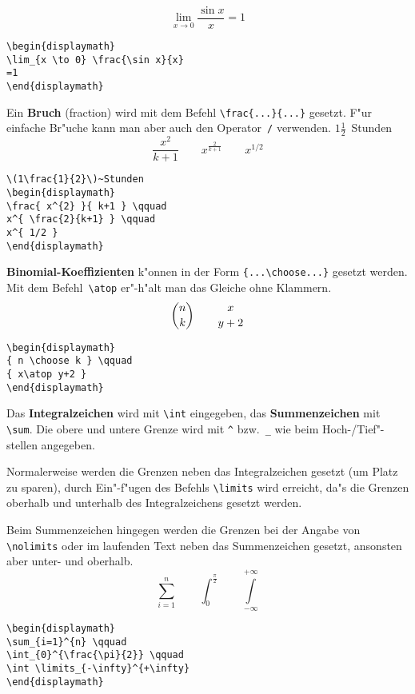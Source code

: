 \exa
\begin{displaymath}
\lim_{x \to 0} \frac{\sin x}{x}
=1
\end{displaymath}
\exb
\begin{verbatim}
\begin{displaymath}
\lim_{x \to 0} \frac{\sin x}{x}
=1
\end{displaymath}
\end{verbatim}
\exc
 
Ein \textbf{Bruch} (fraction) wird mit dem Befehl
\verb|\frac{...}{...}| gesetzt.  F"ur einfache Br"uche kann man
aber auch den Operator~\verb|/| verwenden.
\exa
\(1\frac{1}{2}\)~Stunden
\begin{displaymath}
\frac{ x^{2} }{ k+1 } \qquad
x^{ \frac{2}{k+1} } \qquad
x^{ 1/2 }
\end{displaymath}
\exb
\begin{verbatim}
\(1\frac{1}{2}\)~Stunden
\begin{displaymath}
\frac{ x^{2} }{ k+1 } \qquad
x^{ \frac{2}{k+1} } \qquad
x^{ 1/2 }
\end{displaymath}
\end{verbatim}
\exc

\textbf{Binomial-Koeffizienten} k"onnen in der Form
\verb|{...\choose...}| gesetzt werden.
Mit dem Befehl~\verb|\atop| er"-h"alt man das Gleiche ohne
Klammern.
\exa
\begin{displaymath}
{ n \choose k } \qquad
{ x\atop y+2 }
\end{displaymath}
\exb
\begin{verbatim}
\begin{displaymath}
{ n \choose k } \qquad
{ x\atop y+2 }
\end{displaymath}
\end{verbatim}
\exc

\medskip

Das \textbf{Integralzeichen} wird mit \verb|\int| eingegeben, das
\textbf{Summenzeichen} mit \verb|\sum|.
Die obere und untere Grenze wird mit \verb|^| bzw.~\verb|_| wie
beim \mbox{Hoch-}\slash Tief"-stellen angegeben.
 
Normalerweise werden die Grenzen neben das Integralzeichen
gesetzt (um Platz zu sparen), durch Ein"-f"ugen des Befehls
\verb|\limits| wird erreicht, da"s die Grenzen oberhalb und
unterhalb des Integralzeichens gesetzt werden.
 
Beim Summenzeichen hingegen werden die Grenzen bei der Angabe von
\verb|\nolimits| oder im laufenden Text neben das Summenzeichen
gesetzt, ansonsten aber unter- und oberhalb.
\exa
\begin{displaymath}
\sum_{i=1}^{n} \qquad
\int_{0}^{\frac{\pi}{2}} \qquad
\int \limits_{-\infty}^{+\infty}
\end{displaymath}
\exb
\begin{verbatim}
\begin{displaymath}
\sum_{i=1}^{n} \qquad
\int_{0}^{\frac{\pi}{2}} \qquad
\int \limits_{-\infty}^{+\infty}
\end{displaymath}
\end{verbatim}
\exc
 
